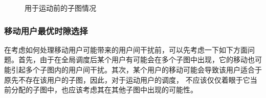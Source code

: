 \begin{figure}[htbp]
    \centering
    \caption{用于运动前的子图情况}
    \label{fig:slot-after-user-move}
\end{figure}

\subsubsection{移动用户最优时隙选择}
在考虑如何处理移动用户可能带来的用户间干扰前，可以先考虑一下如下方面问题。首先，由于在全局调度后某个用户有可能会在多个子图中出现，它的移动也可能引起多个子图内的用户间干扰。其次，某个用户的移动可能会导致该用户适合于原先不存在该用户的子图，因此，对于运动用户的调度，
不应该仅仅着眼于它当前分配的子图中，也应该考虑其在其他子图中出现的可能性。

